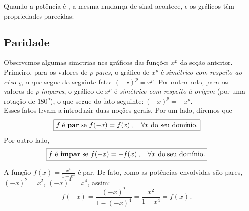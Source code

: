 Quando a potência é , a mesma mudança de sinal acontece, e os gráficos têm
propriedades parecidas:
\begin{center}
\begin{bmlimage}\end{bmlimage}
\end{center}

\subsection{Paridade}

Observemos algumas simetrias nos gráficos das funções $x^p$ da seção anterior.
 Primeiro, para os valores de $p$ \emph{pares}, o gráfico de $x^p$ é \emph{simétrico com
respeito ao eixo $y$}, o que segue do seguinte fato: $(-x)^p=x^p$. 
 Por outro lado, para os valores de $p$ \emph{ímpares}, o gráfico de $x^p$ é
\emph{simétrico com respeito à origem} (por uma rotação de $180^o$), o que segue do fato
seguinte: $(-x)^p=-x^p$. \\

Esses fatos  
levam a introduzir duas noções gerais. Por um lado, diremos que
$$\boxed{\text{$f$ é \textbf{par} se }f(-x)=f(x)\,,\quad\forall x\text{
do seu domínio.}}$$
Por outro lado,
$$\boxed{\text{$f$ é \textbf{impar} se }f(-x)=-f(x)\,,\quad\forall x\text{
do seu domínio.}}$$ 
\begin{ex}
A função $f(x)=\frac{x^2}{1-x^4}$ é par. De fato, como as potências
envolvidas são pares, $(-x)^2=x^2$, $(-x)^4=x^4$, assim:
$$
f(-x)=\frac{(-x)^2}{1-(-x)^4}=\frac{x^2}{1-x^4}=f(x)\,.
$$
\end{ex}

